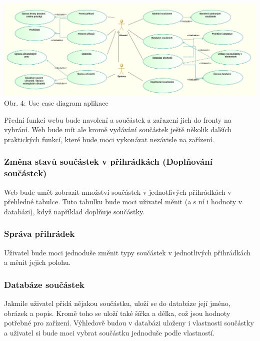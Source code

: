 \documentclass[12pt, a4paper, oneside]{article}
\begin{document}
\begin{minipage}{\textwidth}
\begin{center}
\hspace*{-2cm}
\includegraphics[scale=0.69]{img/use_case_uml.png}
\\
\caption{Obr. 4: Use case diagram aplikace}
\end{center}
\end{minipage}
\vspace{4mm}


Přední funkcí webu bude navolení a součástek a zařazení jich do fronty na vybrání.
Web bude mít ale kromě vydávání součástek ještě několik dalších praktických funkcí, které bude moci vykonávat nezávisle na zařízení.

\subsubsection{Změna stavů součástek v přihrádkách (Doplňování součástek)}

Web bude umět zobrazit množství součástek v jednotlivých přihrádkách v přehledné tabulce. Tuto tabulku bude moci uživatel měnit (a s ní i hodnoty v databázi), když například doplňuje součástky.

\subsubsection{Správa přihrádek}

Uživatel bude moci jednoduše změnit typy součástek v jednotlivých přihrádkách a měnit jejich polohu.

\subsubsection{Databáze součástek}

Jakmile uživatel přidá nějakou součástku, uloží se do databáze její jméno, obrázek a popis. Kromě toho se uloží také šířka a délka, což jsou hodnoty potřebné pro zařízení.
Výhledově budou v databázi uloženy i vlastnosti součástky a uživatel si bude moci vybrat součástku jednoduše podle vlastností.
\end{document}
